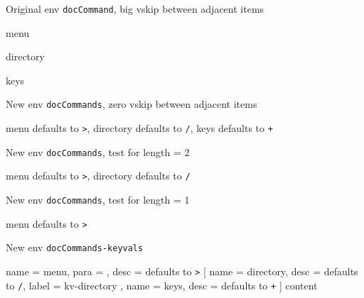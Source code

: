\documentclass{article}
\begin{document}
\begin{example}{Original env \Verb|docCommand|, big vskip between adjacent items}
  
  \begin{docCommand}
    [doc description=\oarg{input sep} defaults to \Verb|>|]
    {menu}
    {}
  \end{docCommand}
  \begin{docCommand}{directory}{}
  \end{docCommand}
  \begin{docCommand}{keys}{}
    \lipsum[23]
  \end{docCommand}
\end{example}


\begin{example}{New env \Verb|docCommands|, zero vskip between adjacent items}
  \begin{docCommands}{
    {menu}
      {}
      { defaults to \Verb|>|},
    {directory}
      {}
      { defaults to \Verb|/|},
    {keys}
      {}
      { defaults to \Verb|+|}}
    \lipsum[23]
  \end{docCommands}
\end{example}

\begin{example}{New env \Verb|docCommands|, test for length = 2}
  \begin{docCommands}{
    {menu}
      {}
      { defaults to \Verb|>|},
    {directory}
      {}
      { defaults to \Verb|/|}}
    \lipsum[23]
  \end{docCommands}
\end{example}

\begin{example}{New env \Verb|docCommands|, test for length = 1}
  \begin{docCommands}{
    {menu}
      {}
      { defaults to \Verb|>|}}
    \lipsum[23]
  \end{docCommands}
\end{example}


\begin{example}{New env \Verb|docCommands-keyvals|}
  \begin{docCommands-keyvals}
    {
      name = menu,
      para = ,
      desc =  defaults to \Verb|>|
    }
    [
      {
        name = directory,
        desc =  defaults to \Verb|/|,
        label = kv-directory
      },
      {
        name = keys,
        desc =  defaults to \Verb|+|
      }
    ]
    content
  \end{docCommands-keyvals}
\end{example}
\end{document}
